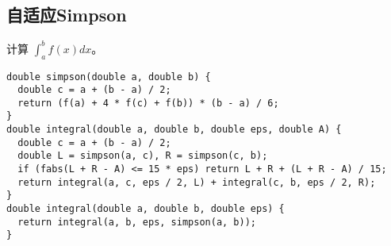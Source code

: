 \subsection{自适应Simpson}
计算 $\int_a^b f(x) dx$。
\begin{lstlisting}
double simpson(double a, double b) {
  double c = a + (b - a) / 2;
  return (f(a) + 4 * f(c) + f(b)) * (b - a) / 6;
}
double integral(double a, double b, double eps, double A) {
  double c = a + (b - a) / 2;
  double L = simpson(a, c), R = simpson(c, b);
  if (fabs(L + R - A) <= 15 * eps) return L + R + (L + R - A) / 15;
  return integral(a, c, eps / 2, L) + integral(c, b, eps / 2, R);
}
double integral(double a, double b, double eps) {
  return integral(a, b, eps, simpson(a, b));
}
\end{lstlisting}
